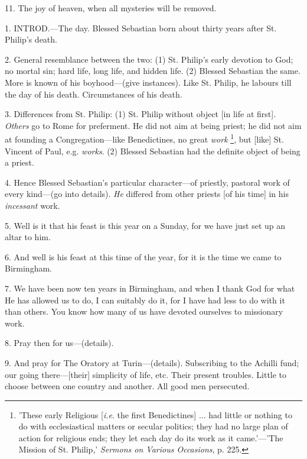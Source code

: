 11. The joy of heaven, when all mysteries will be
removed.


1. INTROD.—The
day. Blessed Sebastian born about thirty years after St. Philip's
death.

2. General resemblance between the two: (1) St.
Philip's early devotion to God; no mortal sin; hard life, long life,
and hidden life. (2) Blessed Sebastian the same. More is known of his
boyhood—(give instances). Like St. Philip, he labours till the day
of his death. Circumstances of his death.

3. Differences from St. Philip: (1) St. Philip
without object [in life at first]. \emph{Others} go to Rome for
preferment. He did not aim at being priest; he did not aim at founding
a Congregation—like Benedictines, no great \emph{work} \footnote{'These early Religious [\emph{i.e}.
the first Benedictines] ... had little or nothing to do with
ecclesiastical matters or secular politics; they had no large plan of
action for religious ends; they let each day do its work as it
came.'—'The Mission of St. Philip,' \emph{Sermons on Various Occasions},
p. 225.}, but [like] St. Vincent of Paul, e.g. \emph{works}. (2)
Blessed Sebastian had the definite object of being a priest.

4. Hence Blessed Sebastian's particular
character—of priestly, pastoral work of every kind—(go into
details). \emph{He} differed from other priests [of his time] in his \emph{incessant}
work.

5. Well is it that his feast is this year on a
Sunday, for we have just set up an altar to him.

6. And well is his feast at this time of the
year, for it is the time we came to Birmingham.

7. We have been now ten years in Birmingham, and
when I thank God for what He has allowed us to do, I can suitably do
it, for I have had less to do with it than others. You know how many
of us have devoted ourselves to missionary work.

8. Pray then for us—(details).

9. And pray for The Oratory at Turin—(details).
Subscribing to the Achilli fund; our going there—[their] simplicity
of life, etc. Their present troubles. Little to choose between one
country and another. All good men persecuted.


